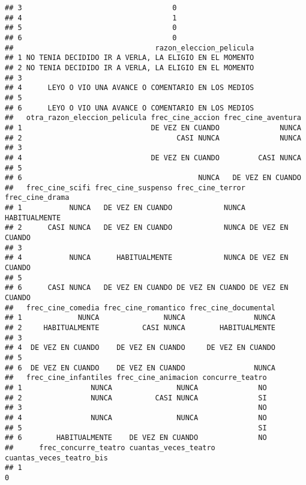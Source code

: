 \documentclass[
]{article}
\begin{document}
\begin{verbatim}
## 3                                   0
## 4                                   1
## 5                                   0
## 6                                   0
##                                 razon_eleccion_pelicula
## 1 NO TENIA DECIDIDO IR A VERLA, LA ELIGIO EN EL MOMENTO
## 2 NO TENIA DECIDIDO IR A VERLA, LA ELIGIO EN EL MOMENTO
## 3                                                      
## 4      LEYO O VIO UNA AVANCE O COMENTARIO EN LOS MEDIOS
## 5                                                      
## 6      LEYO O VIO UNA AVANCE O COMENTARIO EN LOS MEDIOS
##   otra_razon_eleccion_pelicula frec_cine_accion frec_cine_aventura
## 1                              DE VEZ EN CUANDO              NUNCA
## 2                                    CASI NUNCA              NUNCA
## 3                                                                 
## 4                              DE VEZ EN CUANDO         CASI NUNCA
## 5                                                                 
## 6                                         NUNCA   DE VEZ EN CUANDO
##   frec_cine_scifi frec_cine_suspenso frec_cine_terror  frec_cine_drama
## 1           NUNCA   DE VEZ EN CUANDO            NUNCA    HABITUALMENTE
## 2      CASI NUNCA   DE VEZ EN CUANDO            NUNCA DE VEZ EN CUANDO
## 3                                                                     
## 4           NUNCA      HABITUALMENTE            NUNCA DE VEZ EN CUANDO
## 5                                                                     
## 6      CASI NUNCA   DE VEZ EN CUANDO DE VEZ EN CUANDO DE VEZ EN CUANDO
##   frec_cine_comedia frec_cine_romantico frec_cine_documental
## 1             NUNCA               NUNCA                NUNCA
## 2     HABITUALMENTE          CASI NUNCA        HABITUALMENTE
## 3                                                           
## 4  DE VEZ EN CUANDO    DE VEZ EN CUANDO     DE VEZ EN CUANDO
## 5                                                           
## 6  DE VEZ EN CUANDO    DE VEZ EN CUANDO                NUNCA
##   frec_cine_infantiles frec_cine_animacion concurre_teatro
## 1                NUNCA               NUNCA              NO
## 2                NUNCA          CASI NUNCA              SI
## 3                                                       NO
## 4                NUNCA               NUNCA              NO
## 5                                                       SI
## 6        HABITUALMENTE    DE VEZ EN CUANDO              NO
##      frec_concurre_teatro cuantas_veces_teatro cuantas_veces_teatro_bis
## 1                                                                     0

\end{verbatim}
\end{document}
